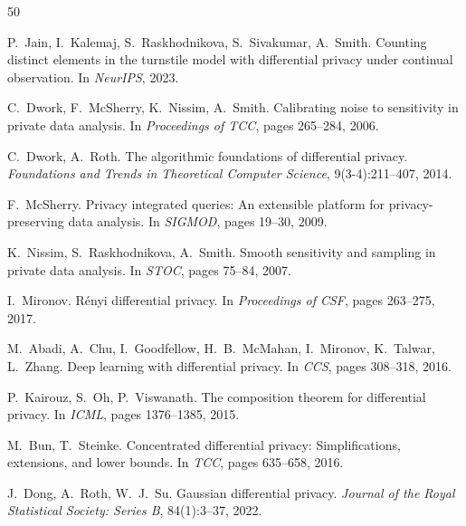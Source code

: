 \documentclass[sigconf,anonymous,review]{acmart}
\begin{document}
\begin{thebibliography}{50}



    P.~Jain, I.~Kalemaj, S.~Raskhodnikova, S.~Sivakumar, A.~Smith.
    \newblock Counting distinct elements in the turnstile model with differential privacy under continual observation.
    \newblock In \emph{NeurIPS}, 2023.

    C.~Dwork, F.~McSherry, K.~Nissim, A.~Smith.
    \newblock Calibrating noise to sensitivity in private data analysis.
    \newblock In \emph{Proceedings of TCC}, pages 265--284, 2006.

    C.~Dwork, A.~Roth.
    \newblock The algorithmic foundations of differential privacy.
    \newblock \emph{Foundations and Trends in Theoretical Computer Science}, 9(3-4):211--407, 2014.

    F.~McSherry.
    \newblock Privacy integrated queries: An extensible platform for privacy-preserving data analysis.
    \newblock In \emph{SIGMOD}, pages 19--30, 2009.

    K.~Nissim, S.~Raskhodnikova, A.~Smith.
    \newblock Smooth sensitivity and sampling in private data analysis.
    \newblock In \emph{STOC}, pages 75--84, 2007.

    I.~Mironov.
    \newblock Rényi differential privacy.
    \newblock In \emph{Proceedings of CSF}, pages 263--275, 2017.

    M.~Abadi, A.~Chu, I.~Goodfellow, H.~B.~McMahan, I.~Mironov, K.~Talwar, L.~Zhang.
    \newblock Deep learning with differential privacy.
    \newblock In \emph{CCS}, pages 308--318, 2016.

    P.~Kairouz, S.~Oh, P.~Viswanath.
    \newblock The composition theorem for differential privacy.
    \newblock In \emph{ICML}, pages 1376--1385, 2015.

    M.~Bun, T.~Steinke.
    \newblock Concentrated differential privacy: Simplifications, extensions, and lower bounds.
    \newblock In \emph{TCC}, pages 635--658, 2016.

    J.~Dong, A.~Roth, W.~J.~Su.
    \newblock Gaussian differential privacy.
    \newblock \emph{Journal of the Royal Statistical Society: Series B}, 84(1):3--37, 2022.


\end{thebibliography}
\end{document}
